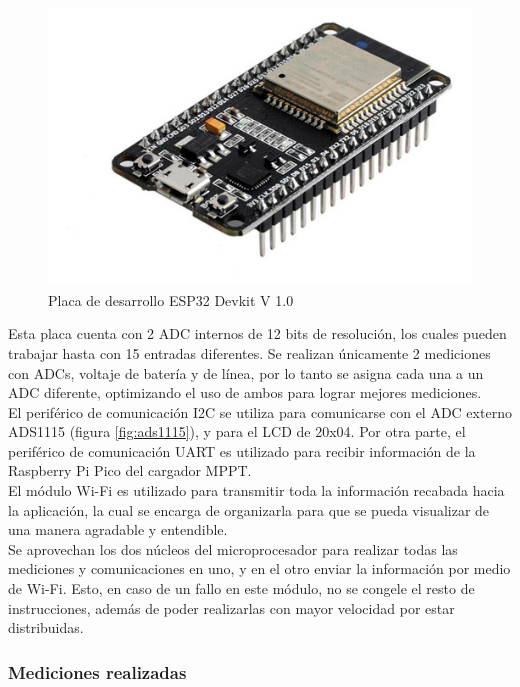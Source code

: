 \begin{figure}[H]
    \centering
    \includegraphics[width=0.75\linewidth]{hardware/ESP32.jpg}
    \caption{Placa de desarrollo ESP32 Devkit V 1.0}
    \label{fig:ESP32}
\end{figure}

Esta placa cuenta con 2 ADC internos de 12 bits de resolución, los cuales pueden trabajar hasta con 15 entradas diferentes. Se realizan únicamente 2 mediciones con ADCs, voltaje de batería y de línea, por lo tanto se asigna cada una a un ADC diferente, optimizando el uso de ambos para lograr mejores mediciones.\\

El periférico de comunicación I2C se utiliza para comunicarse con el ADC externo ADS1115 (figura \ref{fig:ads1115}), y para el LCD de 20x04. Por otra parte, el periférico de comunicación UART es utilizado para recibir información de la Raspberry Pi Pico del cargador MPPT.\\

El módulo Wi-Fi es utilizado para transmitir toda la información recabada hacia la aplicación, la cual se encarga de organizarla para que se pueda visualizar de una manera agradable y entendible.\\

Se aprovechan los dos núcleos del microprocesador para realizar todas las mediciones y comunicaciones en uno, y en el otro enviar la información por medio de Wi-Fi. Esto, en caso de un fallo en este módulo, no se congele el resto de instrucciones, además de poder realizarlas con mayor velocidad por estar distribuidas.\\

\subsubsection{Mediciones realizadas}

